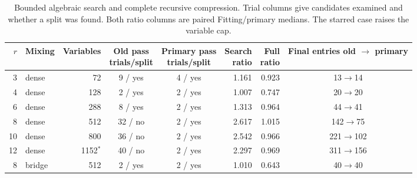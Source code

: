 \begin{table}[!htbp]
\centering\small
\setlength{\tabcolsep}{4pt}
\caption{Bounded algebraic search and complete recursive compression. Trial columns give candidates examined and whether a split was found. Both ratio columns are paired Fitting/primary medians. The starred case raises the variable cap.}
\label{tab:algebra}
\begin{tabular}{rlrccrrc}
\toprule
$r$ & Mixing & Variables & \shortstack{Old pass\\trials/split} & \shortstack{Primary pass\\trials/split} & \shortstack{Search\\ratio} & \shortstack{Full\\ratio} & \shortstack{Final entries\\old $\to$ primary}\\
\midrule
3 & dense & 72 & 9 / yes & 4 / yes & 1.161 & 0.923 & 13$\to$14\\
4 & dense & 128 & 2 / yes & 2 / yes & 1.007 & 0.747 & 20$\to$20\\
6 & dense & 288 & 8 / yes & 2 / yes & 1.313 & 0.964 & 44$\to$41\\
8 & dense & 512 & 32 / no & 2 / yes & 2.617 & 1.015 & 142$\to$75\\
10 & dense & 800 & 36 / no & 2 / yes & 2.542 & 0.966 & 221$\to$102\\
12 & dense & 1152$^\ast$ & 40 / no & 2 / yes & 2.297 & 0.969 & 311$\to$156\\
8 & bridge & 512 & 2 / yes & 2 / yes & 1.010 & 0.643 & 40$\to$40\\
\bottomrule
\end{tabular}
\end{table}
